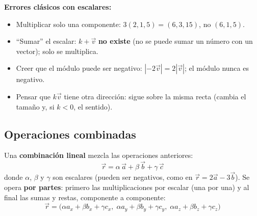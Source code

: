 \documentclass[12pt, letterpaper]{article}
\begin{document}
\begin{cuadroadvertencia}
  \textbf{Errores clásicos con escalares:}
  \begin{itemize}[leftmargin=*]
    \item Multiplicar solo una componente: $3(2,1,5) = (6,3,15)$, no $(6,1,5)$.
    \item ``Sumar'' el escalar: $k + \vec{v}$ \textbf{no existe} (no se puede sumar un número con un vector); solo se multiplica.
    \item Creer que el módulo puede ser negativo: $|-2\vec{v}| = 2|\vec{v}|$; el módulo nunca es negativo.
    \item Pensar que $k\vec{v}$ tiene otra dirección: sigue sobre la misma recta (cambia el tamaño y, si $k<0$, el sentido).
  \end{itemize}
\end{cuadroadvertencia}

\subsection{Operaciones combinadas}

\begin{cuadroteoria}
  Una \textbf{combinación lineal} mezcla las operaciones anteriores:
  $$\vec{r} = \alpha\,\vec{a} + \beta\,\vec{b} + \gamma\,\vec{c}$$
  donde $\alpha$, $\beta$ y $\gamma$ son escalares (pueden ser negativos, como en $\vec{r} = 2\vec{a} - 3\vec{b}$).
  Se opera \textbf{por partes}: primero las multiplicaciones por escalar (una por una) y al final las sumas y restas, componente a componente:
  $$\vec{r} = \big(\alpha a_x + \beta b_x + \gamma c_x,\; \alpha a_y + \beta b_y + \gamma c_y,\; \alpha a_z + \beta b_z + \gamma c_z\big)$$
  \begin{center}
  \end{center}
\end{cuadroteoria}
\end{document}
